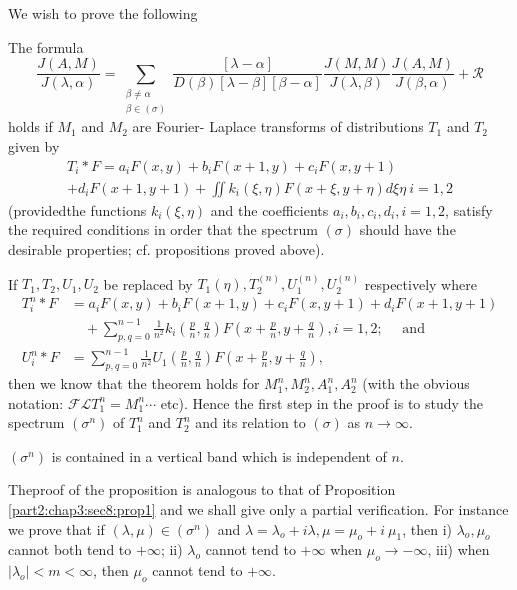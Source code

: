 We wish to prove the following
\begin{theorem*}%
  The formula
  $$
  \frac{J(A,M)}{J(\lambda,\alpha)} = \sum_{\substack{\beta \neq
      \alpha\\ \beta \in (\sigma)}} \frac{[\lambda-\alpha]}{D(\beta)
    [\lambda -\beta] [\beta - \alpha] } \frac {J (M,M)} {J (\lambda,
    \beta)} \frac{J(A,M)} {J (\beta, \alpha)}+ \mathscr{R} 
  $$
  holds if $M_1$ and $M_2$ are Fourier- Laplace transforms of
  distributions $T_1$ and $T_2$  given by 
  \begin{multline*}
  T_i *F= a_i F(x,y)+ b_i F(x+ 1,y) + c_i F(x,y+1)\\
  +d_i F (x+1, y+1) +\iint k_i (\xi,\eta) F (x + \xi, y + \eta) d \xi
  \eta ~i = 1,2   
  \end{multline*}
  (provided\pageoriginale the functions $k_i (\xi,\eta)$ and the coefficients $a_i,
  b_i, c_i, d_i, i = 1,2$, satisfy the required conditions in order
  that the spectrum $(\sigma)$ should have the desirable properties;
  cf. propositions proved above). 
\end{theorem*}

If $T_1, T_2, U_1,U_2$ be replaced by $T_1(\eta), T^{(n)}_2,
U^{(n)}_1,U^{(n)}_2$ respectively where 
\begin{align*}
  T^n_i * F & = a_i F(x,y) + b_i F(x + 1,y) + c_i F(x,y + 1) + d_i F(x +
  1, y+1)\\ 
  &\quad  + \sum_{p,q=0}^{n-1} \frac{1}{n^2} k_i \left(\frac{p}{n},
  \frac{q}{n}\right )
  F\left(x + \frac{p}{n}, y + \frac{q}{n}\right), i= 1,2; \quad \text{ and }\\ 
  U^n_i * F &= \sum_{p,q = 0}^{n-1} \frac{1}{n^2} U_1 \left(\frac{p}{n},
  \frac{q}{n}\right) F \left( x +\frac{p}{n}, y + \frac{q}{n}\right), 
\end{align*}
then we know that the theorem holds for $M^n_1, M^n_2, A^n_1, A^n_2$
(with the obvious notation: $\mathscr{F} \mathscr{L} T^n_1 = M^n_1
\cdots $ etc). Hence the first step in the proof is to study the
spectrum $(\sigma^n)$ of $T^n_1$ and $T^n_2$ and its relation to
$(\sigma)$ as $n \rightarrow \infty$. 

\begin{proposition}\label{part2:chap3:sec8:prop3}%
  $(\sigma^n)$ is contained in a vertical band which is independent of $n$.
\end{proposition}

The\pageoriginale proof of the proposition is analogous to that of
Proposition \ref{part2:chap3:sec8:prop1} 
and we shall give only a partial verification. For instance we prove
that if $(\lambda,\mu) \in (\sigma^n)$ and $\lambda = \lambda_o + i
\lambda, \mu = \mu_o + i ~ \mu_1$, then i) $\lambda_o, \mu_o$ cannot
both tend to $+ \infty$; ii) $\lambda_o$ cannot tend to $+ \infty$
when $\mu_o \rightarrow - \infty$, iii) when $| \lambda_o | < m<
\infty$, then $\mu_o$ cannot tend to $+ \infty$. 

